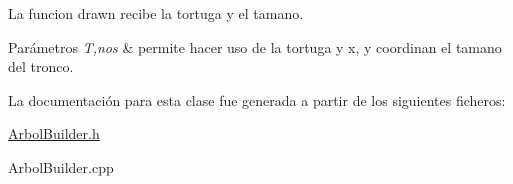 La funcion drawn recibe la tortuga y el tamano. 
\begin{DoxyParams}{Parámetros}
{\em T,nos} & permite hacer uso de la tortuga y x, y coordinan el tamano del tronco. \\
\hline
\end{DoxyParams}


La documentación para esta clase fue generada a partir de los siguientes ficheros\+:\begin{DoxyCompactItemize}
\item 
\hyperlink{ArbolBuilder_8h}{Arbol\+Builder.\+h}\item 
Arbol\+Builder.\+cpp\end{DoxyCompactItemize}

